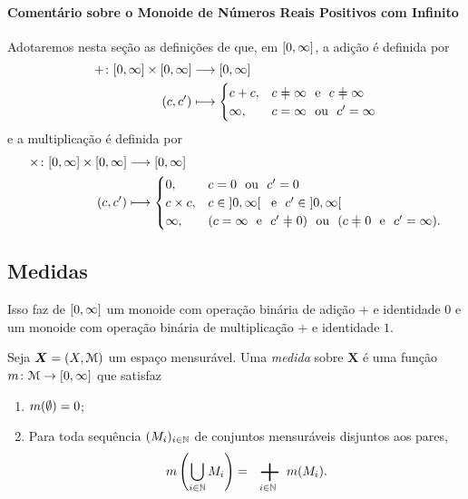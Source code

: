 \paragraph{Comentário sobre o Monoide de Números Reais Positivos com Infinito}

Adotaremos nesta seção as definições de que, em $\left[{0},{\infty}\right]$, a adição é definida por
	\begin{align*}
	\func{+}{\intff{0}{\infty} \times \intff{0}{\infty}}{\intff{0}{\infty}}{(c,c')}{
		\begin{cases}
			c+c,& c \neq \infty \text{\ \ e\ \ } c \neq \infty \\
			\infty,& c=\infty \text{\ \ ou\ \ } c'=\infty
		\end{cases}
	}
	\end{align*}
e a multiplicação é definida por
	\begin{align*}
	\func{\times}{\intff{0}{\infty} \times \intff{0}{\infty}}{\intff{0}{\infty}}{(c,c')}{
		\begin{cases}
			0,& c=0 \text{\ \ ou\ \ } c'=0 \\
			c \times c,& c \in \intaa{0}{\infty} \text{\ \ e\ \ } c' \in \intaa{0}{\infty} \\
			\infty,& (c=\infty \text{\ \ e\ \ } c' \neq 0) \text{\ \ ou\ \ } (c \neq 0 \text{\ \ e\ \ } c'=\infty).
		\end{cases}
	}
	\end{align*}

\subsection{Medidas}

Isso faz de $\left[{0},{\infty}\right]$ um monoide com operação binária de adição $+$ e identidade $0$ e um monoide com operação binária de multiplicação $+$ e identidade $1$.

\begin{definition}
Seja $\bm X=(X,\mathcal{M})$ um espaço mensurável. Uma \emph{medida} sobre $\bm X$ é uma função $m\colon \mathcal{M} \to \left[{0},{\infty}\right]$ que satisfaz
	\begin{enumerate}
	\item $m(\emptyset)=0$;
	\item Para toda sequência $(M_i)_{i \in \mathbb{N}}$ de conjuntos mensuráveis disjuntos aos pares,
	\begin{equation*}
	\med\left(\bigcup_{i \in \N} M_i\right)=\sum_{i \in \N} \med(M_i).
	\end{equation*}
	\end{enumerate}
\end{definition}

